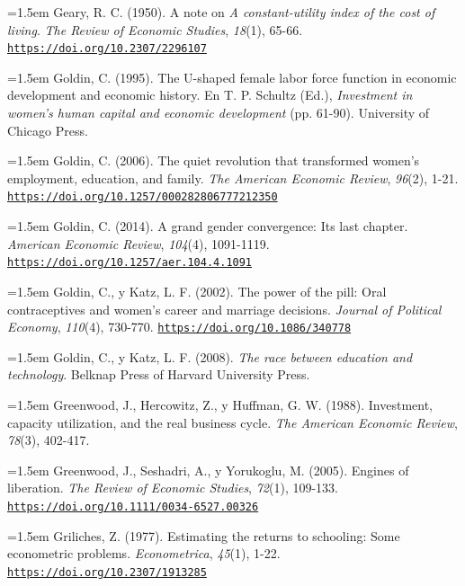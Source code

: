 \documentclass[10pt,a4paper]{article}
\begin{document}
\noindent\hangindent=1.5em Geary, R. C. (1950). A note on \textit{A constant-utility index of the cost of living}. \textit{The Review of Economic Studies}, \textit{18}(1), 65-66. \href{https://doi.org/10.2307/2296107}{\nolinkurl{https://doi.org/10.2307/2296107}}

\noindent\hangindent=1.5em Goldin, C. (1995). The U-shaped female labor force function in economic development and economic history. En T. P. Schultz (Ed.), \textit{Investment in women's human capital and economic development} (pp. 61-90). University of Chicago Press.

\noindent\hangindent=1.5em Goldin, C. (2006). The quiet revolution that transformed women's employment, education, and family. \textit{The American Economic Review}, \textit{96}(2), 1-21. \href{https://doi.org/10.1257/000282806777212350}{\nolinkurl{https://doi.org/10.1257/000282806777212350}}

\noindent\hangindent=1.5em Goldin, C. (2014). A grand gender convergence: Its last chapter. \textit{American Economic Review}, \textit{104}(4), 1091-1119. \href{https://doi.org/10.1257/aer.104.4.1091}{\nolinkurl{https://doi.org/10.1257/aer.104.4.1091}}

\noindent\hangindent=1.5em Goldin, C., y Katz, L. F. (2002). The power of the pill: Oral contraceptives and women's career and marriage decisions. \textit{Journal of Political Economy}, \textit{110}(4), 730-770. \href{https://doi.org/10.1086/340778}{\nolinkurl{https://doi.org/10.1086/340778}}

\noindent\hangindent=1.5em Goldin, C., y Katz, L. F. (2008). \textit{The race between education and technology}. Belknap Press of Harvard University Press.

\noindent\hangindent=1.5em Greenwood, J., Hercowitz, Z., y Huffman, G. W. (1988). Investment, capacity utilization, and the real business cycle. \textit{The American Economic Review}, \textit{78}(3), 402-417.

\noindent\hangindent=1.5em Greenwood, J., Seshadri, A., y Yorukoglu, M. (2005). Engines of liberation. \textit{The Review of Economic Studies}, \textit{72}(1), 109-133. \href{https://doi.org/10.1111/0034-6527.00326}{\nolinkurl{https://doi.org/10.1111/0034-6527.00326}}

\noindent\hangindent=1.5em Griliches, Z. (1977). Estimating the returns to schooling: Some econometric problems. \textit{Econometrica}, \textit{45}(1), 1-22. \href{https://doi.org/10.2307/1913285}{\nolinkurl{https://doi.org/10.2307/1913285}}
\end{document}

